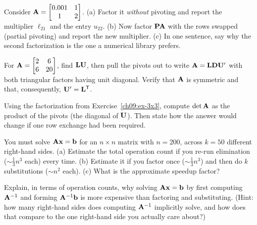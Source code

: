 \begin{exercise}
\label{ch09:ex-pivot-stability}
Consider $\mathbf{A}=\begin{bmatrix} 0.001 & 1 \\ 1 & 2 \end{bmatrix}$. (a) Factor it
\emph{without} pivoting and report the multiplier $\ell_{21}$ and the entry $u_{22}$.
(b) Now factor $\mathbf{P}\mathbf{A}$ with the rows swapped (partial pivoting) and report the new
multiplier. (c) In one sentence, say why the second factorization is the one a numerical
library prefers.
\end{exercise}

\begin{exercise}
\label{ch09:ex-ldu}
For $\mathbf{A}=\begin{bmatrix} 2 & 6 \\ 6 & 20 \end{bmatrix}$, find $\mathbf{L}\mathbf{U}$, then pull
the pivots out to write $\mathbf{A}=\mathbf{L}\mathbf{D}\mathbf{U}'$ with both triangular factors having
unit diagonal. Verify that $\mathbf{A}$ is symmetric and that, consequently, $\mathbf{U}'=\mathbf{L}^{\mathsf{T}}$.
\end{exercise}

\begin{exercise}
\label{ch09:ex-det}
Using the factorization from Exercise~\ref{ch09:ex-3x3}, compute $\det\mathbf{A}$ as the product
of the pivots (the diagonal of $\mathbf{U}$). Then state how the answer would change if one row
exchange had been required.
\end{exercise}

\begin{exercise}
\label{ch09:ex-cost}
You must solve $\mathbf{A}\mathbf{x}=\mathbf{b}$ for an $n\times n$ matrix with $n=200$, across
$k=50$ different right-hand sides. (a) Estimate the total operation count if you re-run
elimination ($\sim\tfrac13 n^3$ each) every time. (b) Estimate it if you factor once
($\sim\tfrac13 n^3$) and then do $k$ substitutions ($\sim n^2$ each). (c) What is the
approximate speedup factor?
\end{exercise}

\begin{exercise}
\label{ch09:ex-noinvert}
Explain, in terms of operation counts, why solving $\mathbf{A}\mathbf{x}=\mathbf{b}$ by first
computing $\mathbf{A}^{-1}$ and forming $\mathbf{A}^{-1}\mathbf{b}$ is more expensive than factoring and
substituting. (Hint: how many right-hand sides does computing $\mathbf{A}^{-1}$ implicitly solve,
and how does that compare to the one right-hand side you actually care about?)
\end{exercise}

